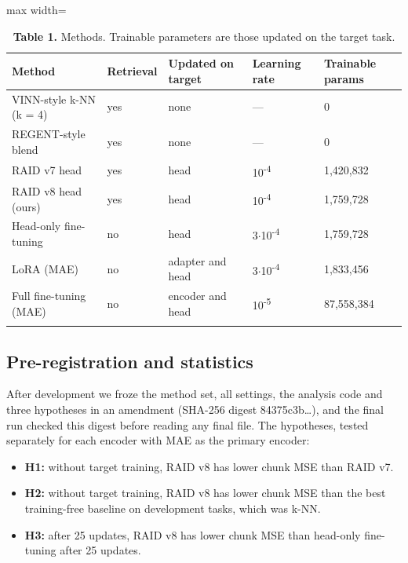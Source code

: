 \documentclass[10pt,twocolumn,letterpaper]{article}
\providecommand{\tightlist}{\setlength{\itemsep}{0pt}\setlength{\parskip}{0pt}}
\begin{document}
\begin{table}[t]\centering\small
\caption*{\textbf{\sffamily Table 1.} Methods. Trainable parameters are those updated on the target task.}
\begin{adjustbox}{max width=\linewidth}
\begin{tabular}{@{}lllll@{}}
\toprule\noalign{}
Method & Retrieval & Updated on target & Learning rate & Trainable params \\
\midrule\noalign{}
VINN-style k-NN (k = 4) & yes & none & --- & 0 \\
REGENT-style blend & yes & none & --- & 0 \\
RAID v7 head & yes & head & 10\textsuperscript{-4} & 1,420,832 \\
RAID v8 head (ours) & yes & head & 10\textsuperscript{-4} & 1,759,728 \\
Head-only fine-tuning & no & head & 3\ensuremath{\cdot}10\textsuperscript{-4} & 1,759,728 \\
LoRA (MAE) & no & adapter and head & 3\ensuremath{\cdot}10\textsuperscript{-4} & 1,833,456 \\
Full fine-tuning (MAE) & no & encoder and head & 10\textsuperscript{-5} & 87,558,384 \\
\bottomrule\noalign{}
\end{tabular}
\end{adjustbox}
\end{table}

\subsection{Pre-registration and statistics}

After development we froze the method set, all settings, the analysis code and three hypotheses in an amendment (SHA-256 digest 84375c3b\ldots), and the final run checked this digest before reading any final file. The hypotheses, tested separately for each encoder with MAE as the primary encoder:

\begin{itemize}
\tightlist
\item
  \textbf{H1:} without target training, RAID v8 has lower chunk MSE than RAID v7.
\item
  \textbf{H2:} without target training, RAID v8 has lower chunk MSE than the best training-free baseline on development tasks, which was k-NN.
\item
  \textbf{H3:} after 25 updates, RAID v8 has lower chunk MSE than head-only fine-tuning after 25 updates.
\end{itemize}
\end{document}
